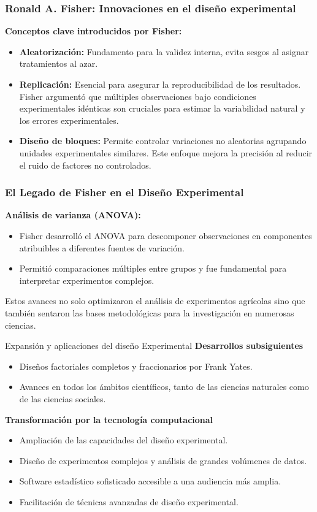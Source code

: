 ﻿\documentclass{beamer}
\begin{document}
\begin{frame}
\frametitle{Ronald A. Fisher: Innovaciones en el diseño experimental}
    \textbf{Conceptos clave introducidos por Fisher:}
    \begin{itemize}
        \item \textbf{Aleatorización:} Fundamento para la validez interna, evita sesgos al asignar tratamientos al azar.
        \item \textbf{Replicación:} Esencial para asegurar la reproducibilidad de los resultados. Fisher argumentó que múltiples observaciones bajo condiciones experimentales idénticas son cruciales para estimar la variabilidad natural y los errores experimentales.
        \item \textbf{Diseño de bloques:} Permite controlar variaciones no aleatorias agrupando unidades experimentales similares. Este enfoque mejora la precisión al reducir el ruido de factores no controlados.
    \end{itemize}

\end{frame}

\begin{frame}
\frametitle{El Legado de Fisher en el Diseño Experimental}
    \textbf{Análisis de varianza (ANOVA):}
    \begin{itemize}
        \item Fisher desarrolló el ANOVA para descomponer observaciones en componentes atribuibles a diferentes fuentes de variación.
        \item Permitió comparaciones múltiples entre grupos y fue fundamental para interpretar experimentos complejos.
    \end{itemize}
    
    Estos avances no solo optimizaron el análisis de experimentos agrícolas sino que también sentaron las bases metodológicas para la investigación en numerosas ciencias.
\end{frame}

\begin{frame}{Expansión y aplicaciones del diseño Experimental}
    \textbf{Desarrollos subsiguientes}
    \begin{itemize}
        \item Diseños factoriales completos y fraccionarios por Frank Yates.
         \item Avances en todos los ámbitos científicos, tanto de las ciencias naturales como de las ciencias sociales.
    \end{itemize}
    \textbf{Transformación por la tecnología computacional}
    \begin{itemize}
        \item Ampliación de las capacidades del diseño experimental.
        \item Diseño de experimentos complejos y análisis de grandes volúmenes de datos.
        \item Software estadístico sofisticado accesible a una audiencia más amplia.
        \item Facilitación de técnicas avanzadas de diseño experimental.
    \end{itemize}
\end{frame}
\end{document}
